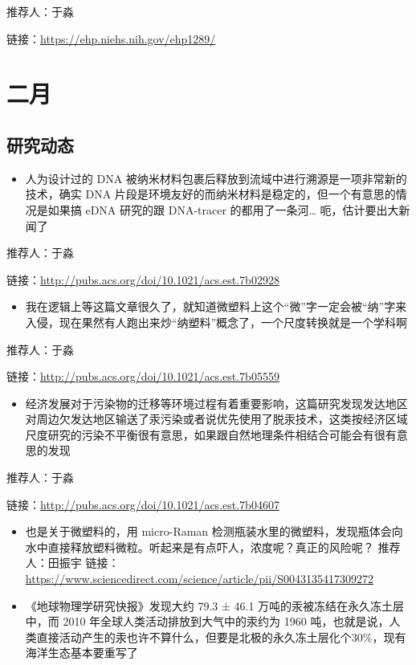 \documentclass[]{book}
\providecommand{\tightlist}{%
  \setlength{\itemsep}{0pt}\setlength{\parskip}{0pt}}
\begin{document}
推荐人：于淼

链接：\url{https://ehp.niehs.nih.gov/ehp1289/}

\hypertarget{ux4e8cux6708}{%
\section*{二月}\label{ux4e8cux6708}}

\hypertarget{ux7814ux7a76ux52a8ux6001-3}{%
\subsection*{研究动态}\label{ux7814ux7a76ux52a8ux6001-3}}

\begin{itemize}
\tightlist
\item
  人为设计过的 DNA 被纳米材料包裹后释放到流域中进行溯源是一项非常新的技术，确实 DNA 片段是环境友好的而纳米材料是稳定的，但一个有意思的情况是如果搞 eDNA 研究的跟 DNA-tracer 的都用了一条河\ldots{} 呃，估计要出大新闻了
\end{itemize}

推荐人：于淼

链接：\url{http://pubs.acs.org/doi/10.1021/acs.est.7b02928}

\begin{itemize}
\tightlist
\item
  我在逻辑上等这篇文章很久了，就知道微塑料上这个``微''字一定会被``纳''字来入侵，现在果然有人跑出来炒``纳塑料''概念了，一个尺度转换就是一个学科啊
\end{itemize}

推荐人：于淼

链接：\url{http://pubs.acs.org/doi/10.1021/acs.est.7b05559}

\begin{itemize}
\tightlist
\item
  经济发展对于污染物的迁移等环境过程有着重要影响，这篇研究发现发达地区对周边欠发达地区输送了汞污染或者说优先使用了脱汞技术，这类按经济区域尺度研究的污染不平衡很有意思，如果跟自然地理条件相结合可能会有很有意思的发现
\end{itemize}

推荐人：于淼

链接：\url{http://pubs.acs.org/doi/10.1021/acs.est.7b04607}

\begin{itemize}
\item
  也是关于微塑料的，用 micro-Raman 检测瓶装水里的微塑料，发现瓶体会向水中直接释放塑料微粒。听起来是有点吓人，浓度呢？真正的风险呢？
  推荐人：田振宇
  链接：\url{https://www.sciencedirect.com/science/article/pii/S0043135417309272}
\item
  《地球物理学研究快报》发现大约 79.3 ± 46.1 万吨的汞被冻结在永久冻土层中，而 2010 年全球人类活动排放到大气中的汞约为 1960 吨，也就是说，人类直接活动产生的汞也许不算什么，但要是北极的永久冻土层化个30\%，现有海洋生态基本要重写了
\end{itemize}
\end{document}
